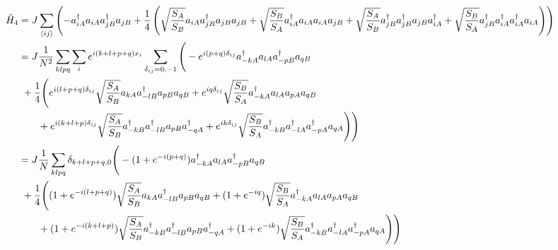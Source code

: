 \documentclass{article}
\begin{document}
\begin{align}
	\hat H_4 &= J \sum_{\braket{ij}} \left( -a_{iA}^\dagger a_{iA} a_{jB}^\dagger a_{jB} + \frac{1}{4} \left( \sqrt{\frac{S_A}{S_B}} a_{iA} a_{jB}^\dagger a_{jB} a_{jB} + \sqrt{\frac{S_B}{S_A}} a_{iA}^\dagger a_{iA} a_{iA} a_{jB} + \sqrt{\frac{S_A}{S_B}} a_{jB}^\dagger a_{jB}^\dagger a_{jB} a_{iA}^\dagger + \sqrt{\frac{S_B}{S_A}} a_{jB}^\dagger a_{iA}^\dagger a_{iA}^\dagger a_{iA} \right) \right) \\
%
	&= J \frac{1}{N^2} \sum_{klpq} \sum_{i} e^{i(k+l+p+q)x_i} \sum_{\delta_{ij} = 0,-1} \Bigg( -e^{i(p+q)\delta_{ij}} a_{-kA}^\dagger a_{lA} a_{-pB}^\dagger a_{qB} \\
	&\ + \frac{1}{4} \Bigg( e^{i(l+p+q)\delta_{ij}} \sqrt{\frac{S_A}{S_B}} a_{kA} a_{-lB}^\dagger a_{pB} a_{qB} + e^{iq\delta_{ij}} \sqrt{\frac{S_B}{S_A}} a_{-kA}^\dagger a_{lA} a_{pA} a_{qB} \\
	&\qquad + e^{i(k+l+p)\delta_{ij}} \sqrt{\frac{S_A}{S_B}} a_{-kB}^\dagger a_{-lB}^\dagger a_{pB} a_{-qA}^\dagger + e^{ik\delta_{ij}} \sqrt{\frac{S_B}{S_A}} a_{-kB}^\dagger a_{-lA}^\dagger a_{-pA}^\dagger a_{qA} \Bigg) \Bigg) \\
%
	&= J \frac{1}{N} \sum_{klpq} \delta_{k+l+p+q,0} \Bigg( -(1 + e^{-i(p+q)}) a_{-kA}^\dagger a_{lA} a_{-pB}^\dagger a_{qB} \\
	&\ + \frac{1}{4} \Bigg( (1 + e^{-i(l+p+q)}) \sqrt{\frac{S_A}{S_B}} a_{kA} a_{-lB}^\dagger a_{pB} a_{qB} + (1 + e^{-iq}) \sqrt{\frac{S_B}{S_A}} a_{-kA}^\dagger a_{lA} a_{pA} a_{qB} \\
	&\qquad + (1 + e^{-i(k+l+p)}) \sqrt{\frac{S_A}{S_B}} a_{-kB}^\dagger a_{-lB}^\dagger a_{pB} a_{-qA}^\dagger + (1 + e^{-ik}) \sqrt{\frac{S_B}{S_A}} a_{-kB}^\dagger a_{-lA}^\dagger a_{-pA}^\dagger a_{qA} \Bigg) \Bigg)
\end{align}
\end{document}
